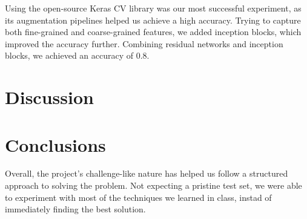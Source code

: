 \documentclass[11pt]{article}
\begin{document}
\begin{multicols}{2}
    Using the open-source Keras CV library was our most successful experiment,
    as its augmentation pipelines helped us achieve a high accuracy. Trying to
    capture both fine-grained and coarse-grained features, we added inception
    blocks, which improved the accuracy further. Combining residual networks
    and inception blocks, we achieved an accuracy of 0.8.

    \section{Discussion}

    \section{Conclusions}

    Overall, the project's challenge-like nature has helped us follow a
    structured approach to solving the problem. Not expecting a pristine test
    set, we were able to experiment with most of the techniques we learned in
    class, instad of immediately finding the best solution.

    
    

\end{multicols}
\end{document}
